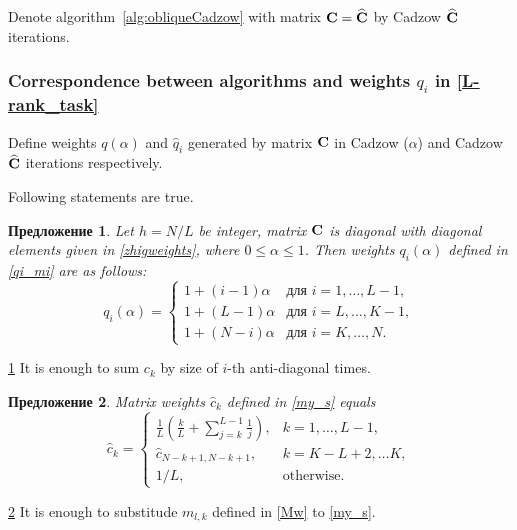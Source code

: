 \documentclass[12pt,a4paper,fleqn,leqno]{article}
\newtheorem{proposition}{Предложение}
\begin{document}
Denote algorithm~\ref{alg:obliqueCadzow} with matrix $\mathbf{C}=\widehat{\mathbf{C}}$ by Cadzow $\widehat{\mathbf{C}}$ iterations.

\subsubsection{Correspondence between algorithms and weights $q_i$ in \eqref{L-rank_task}}

Define weights $q(\alpha)$ and $\hat q_i$ generated by matrix $\mathbf{C}$ in Cadzow ($\alpha$) and Cadzow $\widehat{\mathbf{C}}$ iterations respectively.

Following statements are true.

\begin{proposition}\label{zhigconseq}
Let $h = N/L$ be integer, matrix $\mathbf{C}$ is diagonal with diagonal elements given in \eqref{zhigweights},
where $0 \le \alpha \le 1$. Then weights $q_i(\alpha)$ defined in \eqref{qi_mi} are as follows:
\begin{equation*}
q_i (\alpha) = \begin{cases}
1 + (i - 1) \alpha & \text{для $i = 1, \ldots, L-1,$}\\
1 + (L - 1) \alpha & \text{для $i = L, \ldots, K-1,$}\\
1 + (N - i) \alpha & \text{для $i = K, \ldots, N.$}
\end{cases}
\end{equation*}
\end{proposition}
\begin{proof5}{\ref{zhigconseq}}
It is enough to sum $c_k$ by size of $i$-th anti-diagonal times.
\end{proof5}


\begin{proposition} \label{myweightstat}
Matrix weights $\hat c_k$ defined in \eqref{my_s} equals
\begin{equation*}
\hat c_k = \begin{cases}
\frac{1}{L}\left(\frac{k}{L} + \sum_{j=k}^{L-1} \frac{1}{j} \right),& k = 1, \ldots, L-1, \\
\hat c_{N - k + 1, N - k + 1}, & k = K - L + 2, \ldots K, \\
1/L, &\text{otherwise}.
\end{cases}
\end{equation*}
\end{proposition}

\begin{proof5}{\ref{myweightstat}}
It is enough to substitude $m_{l,k}$ defined in \eqref{Mw} to \eqref{my_s}.
\end{proof5}
\end{document}
